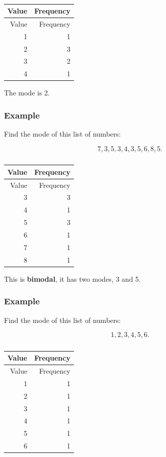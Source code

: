 \documentclass[
]{book}
\begin{document}
\begin{longtable}[]{@{}rr@{}}
\caption{\label{tab:table5}}\tabularnewline
\toprule
Value & Frequency \\
\midrule
\endfirsthead
\toprule
Value & Frequency \\
\midrule
\endhead
1 & 1 \\
2 & 3 \\
3 & 2 \\
4 & 1 \\
\bottomrule
\end{longtable}

The mode is 2.

\hypertarget{example-4}{%
\subsubsection{Example}\label{example-4}}

Find the mode of this list of numbers:

\[ 7, 3, 5, 3, 4, 3, 5, 6, 8, 5.\]

\begin{longtable}[]{@{}rr@{}}
\caption{\label{tab:table6}}\tabularnewline
\toprule
Value & Frequency \\
\midrule
\endfirsthead
\toprule
Value & Frequency \\
\midrule
\endhead
3 & 3 \\
4 & 1 \\
5 & 3 \\
6 & 1 \\
7 & 1 \\
8 & 1 \\
\bottomrule
\end{longtable}

This is \textbf{bimodal}, it has two modes, 3 and 5.

\hypertarget{example-5}{%
\subsubsection{Example}\label{example-5}}

Find the mode of this list of numbers:

\[ 1, 2, 3, 4, 5, 6.\]

\begin{longtable}[]{@{}rr@{}}
\caption{\label{tab:table7}}\tabularnewline
\toprule
Value & Frequency \\
\midrule
\endfirsthead
\toprule
Value & Frequency \\
\midrule
\endhead
1 & 1 \\
2 & 1 \\
3 & 1 \\
4 & 1 \\
5 & 1 \\
6 & 1 \\
\bottomrule
\end{longtable}
\end{document}
